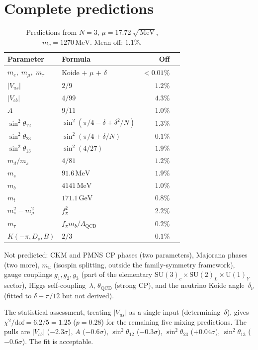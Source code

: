 \documentclass[aps,prd,twocolumn,showpacs,preprintnumbers,superscriptaddress]{revtex4-2}
\newcommand{\SU}{\mathrm{SU}}
\newcommand{\UU}{\mathrm{U}}
\newcommand{\MeV}{\,\mathrm{MeV}}
\newcommand{\GeV}{\,\mathrm{GeV}}
\newcommand{\Lqcd}{\Lambda_{\mathrm{QCD}}}
\begin{document}
\section{Complete predictions}
\label{sec:predictions}

\begin{table}[h]
\centering
\caption{Predictions from $N = 3$, $\mu = 17.72\;\sqrt{\MeV}$,
  $m_c = 1270\MeV$.  Mean off: $1.1\%$.}
\label{tab:predictions}
\begin{tabular}{llrl}
\toprule
Parameter & Formula & Off \\
\midrule
$m_e,\;m_\mu,\;m_\tau$ & Koide $+$ $\mu$ $+$ $\delta$ &
  $< 0.01\%$ \\
$|V_{us}|$ & $2/9$ & $1.2\%$ \\
$|V_{cb}|$ & $4/99$ & $4.3\%$ \\
$A$ & $9/11$ & $1.0\%$ \\
$\sin^2\theta_{12}$ & $\sin^2(\pi/4-\delta+\delta^2/N)$ & $1.3\%$\\
$\sin^2\theta_{23}$ & $\sin^2(\pi/4+\delta/N)$ & $0.1\%$ \\
$\sin^2\theta_{13}$ & $\sin^2(4/27)$ & $1.9\%$ \\
$m_d/m_s$ & $4/81$ & $1.2\%$ \\
$m_s$ & $91.6\MeV$ & $1.9\%$ \\
$m_b$ & $4141\MeV$ & $1.0\%$ \\
$m_t$ & $171.1\GeV$ & $0.8\%$ \\
$m_\pi^2 - m_\mu^2$ & $f_\pi^2$ & $2.2\%$ \\
$m_\tau$ & $f_\pi m_b/\Lqcd$ & $0.2\%$ \\
$K(-\pi,D_s,B)$ & $2/3$ & $0.1\%$ \\
\bottomrule
\end{tabular}
\end{table}

Not predicted: CKM and PMNS CP phases (two parameters),
Majorana phases (two more), $m_u$ (isospin splitting,
outside the family-symmetry framework), gauge couplings
$g_1, g_2, g_3$ (part of the elementary $\SU(3)_c \times
\SU(2)_L \times \UU(1)_Y$ sector), Higgs self-coupling~$\lambda$,
$\theta_{\mathrm{QCD}}$ (strong CP), and the neutrino
Koide angle~$\delta_\nu$ (fitted to $\delta + \pi/12$ but
not derived).

The statistical assessment, treating $|V_{us}|$ as a
single input (determining~$\delta$), gives
$\chi^2/\mathrm{dof} = 6.2/5 = 1.25$ ($p = 0.28$) for
the remaining five mixing predictions.  The pulls are
$|V_{cb}|$ ($-2.3\sigma$), $A$ ($-0.6\sigma$),
$\sin^2\theta_{12}$ ($-0.3\sigma$),
$\sin^2\theta_{23}$ ($+0.04\sigma$),
$\sin^2\theta_{13}$ ($-0.6\sigma$).
The fit is acceptable.
\end{document}
